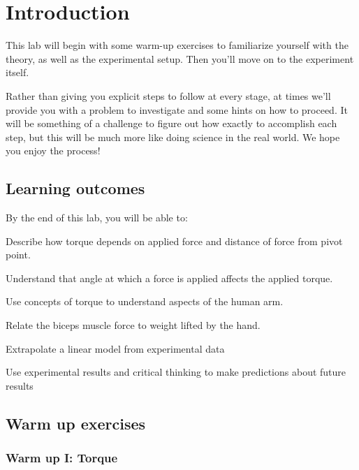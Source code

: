 \section*{Introduction}

This lab will begin with some warm-up exercises to familiarize yourself 
with the theory, as well as the experimental setup.
Then you'll move on to the experiment itself.

Rather than giving you explicit steps to follow at every stage,
at times we'll provide you with a problem to investigate
and some hints on how to proceed.  
It will be something of a challenge to figure out how exactly to accomplish
each step, but this will be much more like doing science in the real world.
We hope you enjoy the process!

\subsection*{Learning outcomes}
By the end of this lab, you will be able to:
\enumb[label=\roman*.]
\item Describe how torque depends on applied force and distance 
of force from pivot point.
\item Understand that angle at which a force is applied 
	affects the applied torque.
\item Use concepts of torque to understand aspects of the human arm.
\item Relate the biceps muscle force to weight lifted by the hand.
\item Extrapolate a linear model from experimental data
\item Use experimental results and critical thinking
	to make predictions about future results
\enume

\pagebreak

\subsection*{Warm up exercises}

\subsubsection*{Warm up I:  Torque}

\begin{comment}
}}}
\TODO[inline]{Note:  These questions would probably work better if
	the students could actually perform 
	some of these mini-experiments.
	I'm planning to talk to those in charge (not Marty, but others)
	to ask whether we have the materials needed to investigate 
	the balance of torques on a simple lever-fulcrum system
	(like the one in the 
	\protect\url{https://www.dropbox.com/sh/i3iftgdflca6yj0/AAA37zsDuMN591__i-oPnjiSa/Suite\%20II/Instruction/Student_Materials/01_Torque/Tutorial_01_Torque.doc?dl=0}
	{open source tutorial activity}
	).
	{\bf Such an apparatus will not be available this quarter, but it may
	work for next quarter} -- 
	depending on the resources already in place.
}
}}}
\end{comment}

